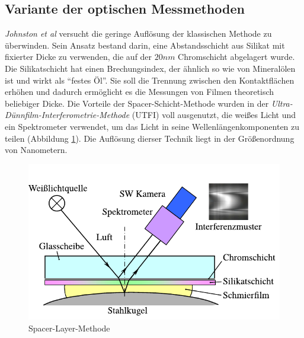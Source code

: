 \subsection{Variante der optischen Messmethoden}
\label{sub:variante_der_optischen_messmethoden}

\textit{Johnston et al} \cite{johnston_1991} versucht die geringe Auflösung der klassischen Methode zu überwinden.
Sein Ansatz bestand darin, eine Abstandsschicht aus Silikat mit fixierter Dicke zu verwenden, die auf der $20 nm$ Chromschicht abgelagert wurde.
Die Silikatschicht hat einen Brechungsindex, der ähnlich so wie von Mineralölen ist und wirkt als "`festes Öl"'. Sie soll die Trennung zwischen den Kontaktflächen erhöhen und dadurch ermöglicht es die Messungen von Filmen theoretisch beliebiger Dicke.
Die Vorteile der Spacer-Schicht-Methode wurden in der \textit{Ultra-Dünnfilm-Interferometrie-Methode} (UTFI) voll ausgenutzt, die weißes Licht und ein Spektrometer verwendet, um das Licht in seine Wellenlängenkomponenten zu teilen (Abbildung \ref{fig:ehd_spacer_layer_johnston}).
Die Auflösung dierser Technik liegt in der Größenordnung von Nanometern.
\begin{figure}[htb]
    \centering
    \includegraphics[]{./images/spacer_layer_methode_furtuna.pdf}
    \caption{Spacer-Layer-Methode \cite{johnston_1991}}
    \label{fig:ehd_spacer_layer_johnston}
\end{figure}
%


